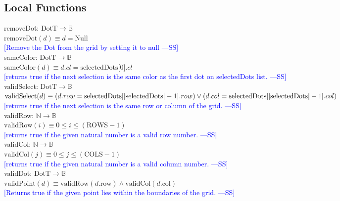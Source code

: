 \documentclass[12pt]{article}
\newcommand{\authornote}[3]{\textcolor{#1}{[#3 ---#2]}}
\newcommand{\authornote}[3]{}
\newcommand{\wss}[1]{\authornote{blue}{SS}{#1}}
\begin{document}
\newpage

\subsection*{Local Functions}

\noindent removeDot: $\mbox{DotT} \rightarrow \mathbb{B}$\\
$\mbox{removeDot}(d) \equiv  d = \mbox{Null}$\\
\noindent \wss{Remove the Dot from the grid by setting it to null}\\

\noindent sameColor: $\mbox{DotT} \rightarrow \mathbb{B}$\\
$\mbox{sameColor}(d) \equiv  d.cl = \mbox{selectedDots[0]}.cl$\\
\noindent \wss{returns true if the next selection is the same color as the first dot on selectedDots list.}\\

\noindent validSelect: $\mbox{DotT} \rightarrow \mathbb{B}$\\
$\mbox{validSelect}(d) \equiv  (d.row = \mbox{selectedDots}[|\mbox{selectedDots}| - 1].row) \vee \\ 
(d.col = \mbox{selectedDots}[|\mbox{selectedDots}| - 1].col)$\\
\noindent \wss{returns true if the next selection is the same row or column of the grid.}\\

\noindent validRow: $\mathbb{N} \rightarrow \mathbb{B}$\\
$\mbox{validRow}(i) \equiv 0 \leq i \leq (\mbox{ROWS} - 1)$\\
\noindent \wss{returns true if the given natural number is a valid row number.}\\

\noindent validCol: $\mathbb{N} \rightarrow \mathbb{B}$\\
$\mbox{validCol}(j) \equiv 0 \leq j \leq (\mbox{COLS} - 1)$\\
\noindent \wss{returns true if the given natural number is a valid column number.}\\

\noindent validDot: $\mbox{DotT} \rightarrow \mathbb{B}$\\
$\mbox{validPoint}(d) \equiv \mbox{validRow}(d.\mbox{row}) \wedge \mbox{validCol}(d.\mbox{col})$\\
\noindent \wss{Returns true if the given point lies within the boundaries of the grid.}\\
\end{document}
